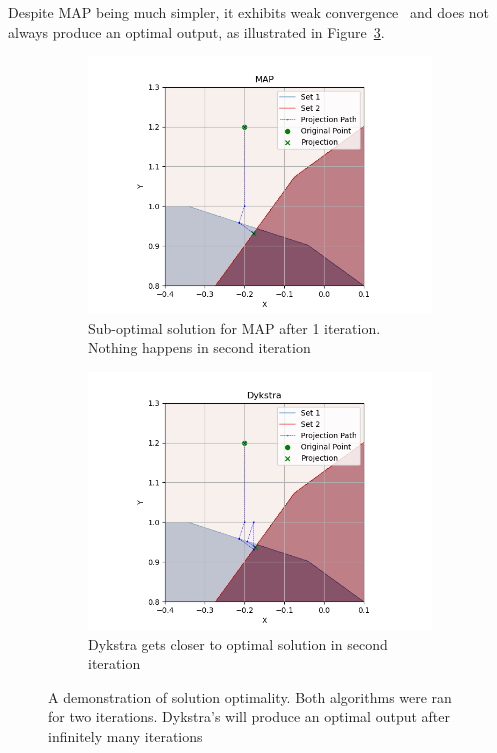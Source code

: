 \documentclass[hidelinks]{article}
\begin{document}
%
\newline
Despite MAP being much simpler, it exhibits weak convergence~\cite{BREGMAN} and does not always produce an optimal output, as illustrated in Figure~\ref{fig:demonstration}.
%
\begin{figure}[h]
    \centering
    
    \begin{subfigure}[t]{0.49\textwidth}
        \centering
        \includegraphics[width=1\textwidth]{Latex/Current Version/Figures/MAP_demonstration.png}
        \caption{Sub-optimal solution for MAP after 1 iteration. Nothing happens in second iteration}
        \label{fig:demonstrationMAP}
    \end{subfigure}
    \hfill
    \begin{subfigure}[t]{0.49\textwidth}
        \centering
        \includegraphics[width=1\textwidth]{Latex/Current Version/Figures/Dykstra_demonstration.png}
        \caption{Dykstra gets closer to optimal solution in second iteration}
        \label{fig:demonstrationDykstra}
    \end{subfigure}
    \caption{A demonstration of solution optimality. Both algorithms were ran for two iterations. Dykstra's will produce an optimal output after infinitely many iterations}
    \label{fig:demonstration}
\end{figure}
\end{document}
